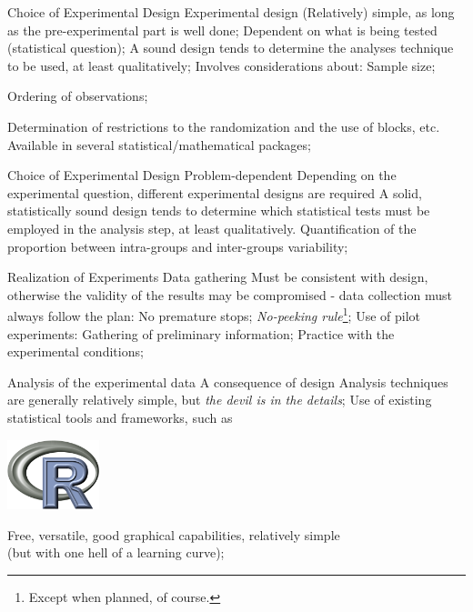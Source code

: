 \documentclass[t]{beamer}
\begin{document}
\begin{ftst}
{Choice of Experimental Design}
{Experimental design}
\bitems (Relatively) simple, as long as the pre-experimental part is well done;
	\spitem Dependent on what is being tested (statistical question);
	\spitem A sound design tends to determine the analyses technique to be used, at least  qualitatively;
	\spitem Involves considerations about:
	\bitems Sample size;
		\item Ordering of observations;
		\item Determination of restrictions to the randomization and the use of blocks, etc.
	\eitem
	\spitem Available in several statistical/mathematical packages;
\eitem
\end{ftst}


\begin{ftst}
{Choice of Experimental Design}
{Problem-dependent}
\bitems Depending on the experimental question, different experimental designs are required
	\spitem A solid, statistically sound design tends to determine which statistical tests must be employed in the analysis step, at least qualitatively.
	\spitem Quantification of the proportion between intra-groups and inter-groups variability;
\eitem
\end{ftst}

\begin{ftst}
{Realization of Experiments}
{Data gathering}
\bitems Must be consistent with design, otherwise the validity of the results may be compromised - data collection must always follow the plan:\vhalf
	\bitems No premature stops;	
		\spitem\textit{No-peeking rule}\footnote[1]{Except when planned, of course.};
	\eitem
	\spitem Use of pilot experiments:\vhalf
	\bitems Gathering of preliminary information;
		\spitem Practice with the experimental conditions;
	\eitem
\eitem
\end{ftst}


\begin{ftst}
{Analysis of the experimental data}
{A consequence of design}
\bitems Analysis techniques are generally relatively simple, but \textit{the devil is in the details};
	\spitem Use of existing statistical tools and frameworks, such as
\eitem
\begin{center}
\includegraphics[width=0.2\textwidth]{../figs/rlogo.png}
\end{center}
\bitems Free, versatile, good graphical capabilities, relatively simple\\
(but with one hell of a learning curve);
\eitem
\end{ftst}
\end{document}
